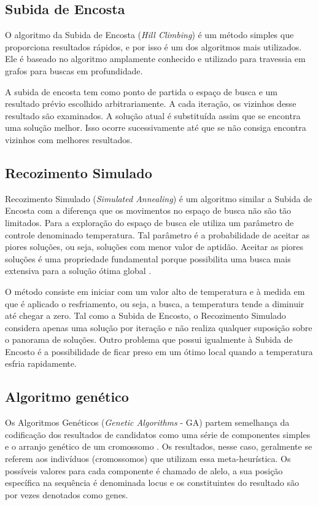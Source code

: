 \subsection{Subida de Encosta}

O algoritmo da Subida de Encosta (\textit{Hill Climbing}) é um método simples que proporciona resultados rápidos, e por isso é um dos algoritmos mais utilizados. Ele é baseado no algoritmo amplamente conhecido e utilizado para travessia em grafos para buscas em profundidade.

A subida de encosta tem como ponto de partida o espaço de busca e um resultado prévio escolhido arbitrariamente. A cada iteração, os vizinhos desse resultado são examinados. A solução atual é substituída assim que se encontra uma solução melhor. Isso ocorre sucessivamente até que se não consiga encontra vizinhos com melhores resultados.  

\subsection{Recozimento Simulado}

Recozimento Simulado (\textit{Simulated Annealing}) é um algoritmo similar a Subida de Encosta com a diferença que os movimentos no espaço de busca não são tão limitados. Para a exploração do espaço de busca ele utiliza um parâmetro de controle denominado temperatura. Tal parâmetro é a probabilidade de aceitar as piores soluções, ou seja, soluções com menor valor de aptidão. Aceitar as piores soluções é uma propriedade fundamental porque possibilita uma busca mais extensiva para a solução ótima global \cite{kirkpatrick1983optimization}. 

O método consiste em iniciar com um valor alto de temperatura e à medida em que é aplicado o resfriamento, ou seja, a busca, a temperatura tende a diminuir até chegar a zero. Tal como a Subida de Encosto, o Recozimento Simulado considera apenas uma solução por iteração e não realiza qualquer suposição sobre o panorama de soluções. Outro problema que possui igualmente à Subida de Encosto é a possibilidade de ficar preso em um ótimo local quando a temperatura esfria rapidamente.

\subsection{Algoritmo genético}

Os Algoritmos Genéticos (\textit{Genetic Algorithms} - GA) partem semelhança da codificação dos resultados de candidatos como uma série de componentes simples e o arranjo genético de um cromossomo \cite{alander1998genetic}. Os resultados, nesse caso, geralmente se referem aos indivíduos (cromossomos) que utilizam essa meta-heurística. Os possíveis valores para cada componente é chamado de alelo, a sua posição específica na sequência é denominada locus e os constituintes do resultado são por vezes denotados como genes.

